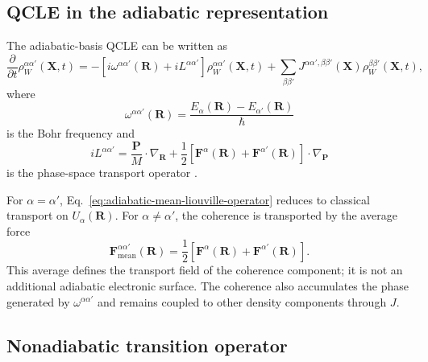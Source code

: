 \documentclass[
  11pt,
  letterpaper,
  onehalfspacing,
  normalmargins,
  equalmargins,
  oneside
]{ut-thesis}
\begin{document}
\subsection{QCLE in the adiabatic representation}
\label{subsec:qcle-adiabatic-representation}

The adiabatic-basis QCLE can be written as
\begin{equation}
\frac{\partial}{\partial t}
\rho_W^{\alpha\alpha'}(\mathbf X,t)
=
-
\left[
i\omega^{\alpha\alpha'}(\mathbf R)
+
iL^{\alpha\alpha'}
\right]
\rho_W^{\alpha\alpha'}(\mathbf X,t)
+
\sum_{\beta\beta'}
J^{\alpha\alpha',\beta\beta'}(\mathbf X)
\rho_W^{\beta\beta'}(\mathbf X,t),
\label{eq:adiabatic-qcle}
\end{equation}
where
\begin{equation}
\omega^{\alpha\alpha'}(\mathbf R)
=
\frac{
E_\alpha(\mathbf R)-E_{\alpha'}(\mathbf R)
}{\hbar}
\label{eq:adiabatic-bohr-frequency}
\end{equation}
is the Bohr frequency and
\begin{equation}
iL^{\alpha\alpha'}
=
\frac{\mathbf P}{M}\cdot
\nabla_{\mathbf R}
+
\frac{1}{2}
\left[
\mathbf F^\alpha(\mathbf R)
+
\mathbf F^{\alpha'}(\mathbf R)
\right]\cdot
\nabla_{\mathbf P}
\label{eq:adiabatic-mean-liouville-operator}
\end{equation}
is the phase-space transport operator
\cite{KapralCiccotti1999JCP,NielsenKapralCiccotti2000,Kapral2016SurfaceHopping}.

For \(\alpha=\alpha'\), Eq.~\eqref{eq:adiabatic-mean-liouville-operator}
reduces to classical transport on \(U_\alpha(\mathbf R)\). For
\(\alpha\neq\alpha'\), the coherence is transported by the average force
\begin{equation}
\mathbf F_{\mathrm{mean}}^{\alpha\alpha'}(\mathbf R)
=
\frac{1}{2}
\left[
\mathbf F^\alpha(\mathbf R)
+
\mathbf F^{\alpha'}(\mathbf R)
\right].
\label{eq:adiabatic-coherence-mean-force}
\end{equation}
This average defines the transport field of the coherence component; it is not
an additional adiabatic electronic surface. The coherence also accumulates
the phase generated by
\(\omega^{\alpha\alpha'}\) and remains coupled to other density components
through \(J\).


\subsection{Nonadiabatic transition operator}
\label{subsec:nonadiabatic-transition-operator}
\end{document}
